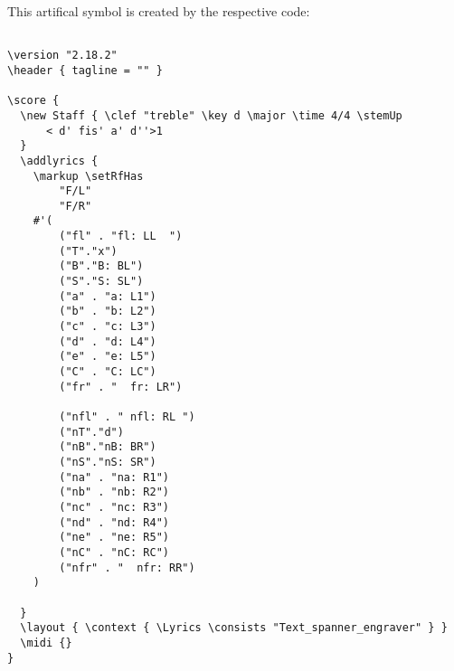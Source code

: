 \documentclass[
  DIV=calc,
  BCOR=5mm,
  12pt,
  headings=small,
  oneside,
  abstract=true,
  toc=bib,
  xcolor=dvipsnames,
  openany,
  ngerman,english]{scrartcl}
\begin{document}
\begin{center}
\end{center}

This artifical symbol is created by the respective code:

\begin{scriptsize}
\begin{verbatim}

\version "2.18.2"
\header { tagline = "" }

\score {
  \new Staff { \clef "treble" \key d \major \time 4/4 \stemUp 
      < d' fis' a' d''>1  
  }
  \addlyrics {
    \markup \setRfHas 
        "F/L"
        "F/R" 
    #'( 
        ("fl" . "fl: LL  ")
        ("T"."x")
        ("B"."B: BL")
        ("S"."S: SL")
        ("a" . "a: L1")
        ("b" . "b: L2")
        ("c" . "c: L3")
        ("d" . "d: L4")
        ("e" . "e: L5")
        ("C" . "C: LC")
        ("fr" . "  fr: LR")
        
        ("nfl" . " nfl: RL ")
        ("nT"."d")
        ("nB"."nB: BR")
        ("nS"."nS: SR")
        ("na" . "na: R1")
        ("nb" . "nb: R2")
        ("nc" . "nc: R3")
        ("nd" . "nd: R4")
        ("ne" . "ne: R5")
        ("nC" . "nC: RC")
        ("nfr" . "  nfr: RR")
    )
    
  }
  \layout { \context { \Lyrics \consists "Text_spanner_engraver" } }
  \midi {}
}
\end{verbatim}
\end{scriptsize}
\end{document}
